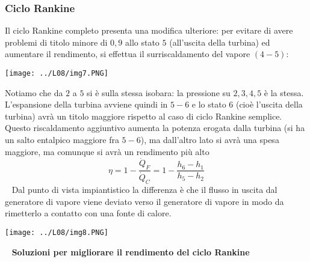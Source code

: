 \subsubsection{Ciclo Rankine}
Il ciclo Rankine completo presenta una modifica ulteriore: per evitare di avere problemi di titolo minore di $0,9$ allo stato $5$ (all'uscita della turbina) ed aumentare il rendimento, si effettua il surriscaldamento del vapore $(4-5)$:
\begin{center}
    \texttt{[image: ../L08/img7.PNG]}
\end{center}
Notiamo che da $2$ a $5$ si è sulla stessa isobara: la pressione su $2,3,4,5$ è la stessa.\newline
\newline
L'espansione della turbina avviene quindi in $5-6$ e lo stato $6$ (cioè l'uscita della turbina) avrà un titolo maggiore rispetto al caso di ciclo Rankine semplice.\newline
\newline
Questo riscaldamento aggiuntivo aumenta la potenza erogata dalla turbina (si ha un salto entalpico maggiore fra $5-6$), ma dall'altro lato si avrà una spesa maggiore, ma comunque si avrà un rendimento più alto
\[
    \eta = 1- \frac{\dot{Q}_F}{\dot{Q}_C} = 1- \frac{h_6-h_1}{h_5-h_2}
\]
\ \newline
Dal punto di vista impiantistico la differenza è che il flusso in uscita dal generatore di vapore viene deviato verso il generatore di vapore in modo da rimetterlo a contatto con una fonte di calore.
\begin{center}
    \texttt{[image: ../L08/img8.PNG]}
\end{center}
\ \newline
\textbf{Soluzioni per migliorare il rendimento del ciclo Rankine}\newline
